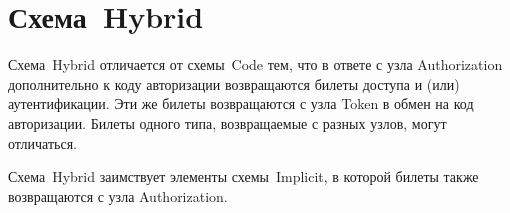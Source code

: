 \section{Схема~Hybrid}\label{OIDC.Hybrid}

Схема~Hybrid отличается от схемы~Code тем, что в ответе с узла Authorization 
дополнительно к коду авторизации возвращаются билеты доступа и (или) 
аутентификации.
%
Эти же билеты возвращаются с узла Token в обмен на код авторизации. 
Билеты одного типа, возвращаемые с разных узлов, могут отличаться.

Схема~Hybrid заимствует элементы схемы~Implicit, в которой билеты также 
возвращаются с узла Authorization. 







